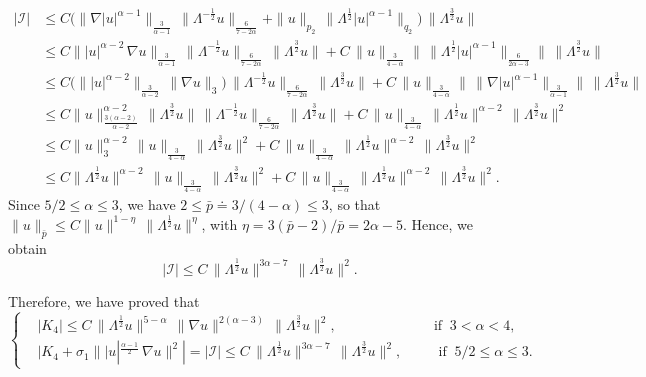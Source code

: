 \documentclass[a4paper]{article}
\begin{document}
  \begin{equation*}
    \begin{aligned}
      |\mathcal I| &\le C \Big( \|\nabla
      |u|^{\alpha-1}\|_{\frac{3}{\alpha-1}}\,
      \|\Lambda^{-\frac{1}{2}}u\|_{\frac{6}{7-2\alpha}}+\|u\|_{p_2}\,
      \|\Lambda^{\frac12} |u|^{\alpha-1}\|_{q_2}\Big)\,
      \|\Lambda^\frac32 u\|
      \\
      &\le C\||u|^{\alpha-2}\, \nabla u\|_{\frac{3}{\alpha-1}}\,
      \|\Lambda^{-\frac{1}{2}} u\|_{\frac{6}{7-2\alpha}}\,
      \|\Lambda^{\frac32} u\| + C\,
      \|u\|_{\frac{3}{4-\alpha}}\|\,\|\Lambda^{\frac12}
      |u|^{\alpha-1}\|_{\frac{6}{2\alpha-3}}\|\,
      \|\Lambda^{\frac32} u\|
      \\
      &\le C\big(\||u|^{\alpha-2}\|_{\frac{3}{\alpha-2}}\, \|\nabla u\|_3\big)\,
      \|\Lambda^{-\frac{1}{2}} u\|_{\frac{6}{7-2\alpha}}\,
      \|\Lambda^{\frac32} u\|+C\, \|u\|_{\frac{3}{4-\alpha}}\|\,\|\nabla
      |u|^{\alpha-1}\|_{\frac{3}{\alpha-1}}\|\,
      \|\Lambda^{\frac32} u\|
      \\
      &\le C \|u\|^{\alpha-2}_{\frac{3(\alpha-2)}{\alpha-2}}\,
      \|\Lambda^\frac32 u\|\, \|\Lambda^{-\frac{1}{2}}
      u\|_{\frac{6}{7-2\alpha}}\, \|\Lambda^\frac32 u\|+C\,
      \|u\|_{\frac{3}{4-\alpha}}\,\|\Lambda^\frac12 u\|^{\alpha-2}\,
      \|\Lambda^\frac32 u\|^2
      \\
      &\le C\|u\|_3^{\alpha-2}\,\|u\|_{\frac{3}{4-\alpha}}\,
      \|\Lambda^\frac32 u\|^2+C\,
      \|u\|_{\frac{3}{4-\alpha}}\,\|\Lambda^\frac12 u\|^{\alpha-2}\,
      \|\Lambda^\frac32 u\|^2
      \\
      &\le C\|\Lambda^\frac12
      u\|^{\alpha-2}\,\|u\|_{\frac{3}{4-\alpha}}\, \|\Lambda^\frac32
      u\|^2+C\, \|u\|_{\frac{3}{4-\alpha}}\,\|\Lambda^\frac12
      u\|^{\alpha-2}\, \|\Lambda^\frac32 u\|^2.
    \end{aligned}
  \end{equation*}
  Since {$5/2 \le \alpha \le 3$, we have
  $2\le \bar p\doteq  3/(4-\alpha) \le 3$}, so that
  $\|u\|_{\bar p} \le C\|u\|^{1-\eta}\, \|\Lambda^\frac12 u\|^\eta$,
  with $\eta = 3(\bar p-2)/\bar p = 2\alpha-5$.
%
  Hence, we obtain
  \begin{equation*}
    |\mathcal I|\le C\, \|\Lambda^{\frac12} u\|^{3\alpha -7}\,\|\Lambda^{\frac32} u\|^2.
  \end{equation*}
  
  Therefore, we have proved that
      \begin{equation*} \label{K_4.ii} \left\{
        \begin{aligned}
          & |K_4| \le C\,\|\Lambda^{\frac12} u\|^{5-\alpha}\, \|\nabla
          u\|^{2(\alpha-3)}\, \|\Lambda^{\frac32} u\|^2, \,\,\,\, &&\mbox{
            if } \ {3< \alpha <4},
          \\
           & |K_4+\sigma_1\||u|^\frac{\alpha-1}{2}\, \nabla u\|^2|= |\mathcal{I}|\le C\,
          \|\Lambda^\frac12 u\|^{3\alpha -7}\,\|\Lambda^{\frac32} u\|^2,
          \,\,\,\, && \mbox{ if } \ {5/2 \le \alpha \le 3}.
        \end{aligned}
      \right.
    \end{equation*}
\end{document}
